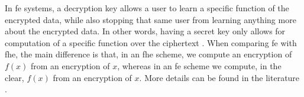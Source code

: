 In \acf{fe} systems, a decryption key allows a user to learn a specific function of the encrypted data, while also stopping that same user from learning anything more about the encrypted data. In other words, having a secret key only allows for computation of a specific function over the ciphertext \cite{boneh2011functional}. When comparing \ac{fe} with \ac{fhe}, the main difference is that, in an \ac{fhe} scheme, we compute an encryption of $f(x)$ from an encryption of $x$, whereas in an \ac{fe} scheme we compute, in the clear, $f(x)$ from an encryption of $x$. More details can be found in the literature \cite{alwen2013relationship}. 



